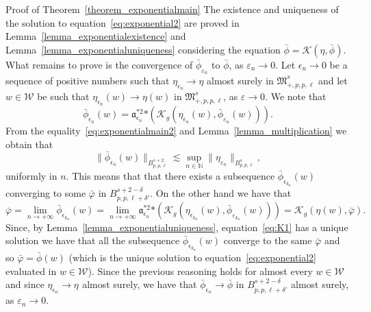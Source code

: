 \documentclass[a4paper,10pt]{article}
\newcommand{\asterisk}{\mathord{*}}
\newenvironment{proof*}[1]{\noindent\textbf{#1\ }}{\hspace*{\fill}$\Box$\medskip}
\begin{document}
\begin{proof*}{Proof of Theorem~\ref{theorem_exponentialmain}}
  The existence and uniqueness of the solution to
  equation~{\eqref{eq:exponential2}} are proved in
  Lemma~\ref{lemma_exponentialexistence} and
  Lemma~\ref{lemma_exponentialuniqueness} considering the equation $\bar{\phi}
  = \mathcal{K} (\eta, \bar{\phi})$. What remains to prove is the convergence
  of $\bar{\phi}_{\varepsilon_n}$ to $\bar{\phi}$, as $\varepsilon_n
  \rightarrow 0$. Let $\epsilon_n \rightarrow 0$ be a sequence of positive
  numbers such that $\eta_{\epsilon_n} \rightarrow \eta$ almost surely in
  $\mathfrak{M}^s_{+, p, p, \ell}$ and let $w \in \mathcal{W}$ be such that
  $\eta_{\epsilon_n} (w) \rightarrow \eta (w)$ in $\mathfrak{M}^s_{+, p, p,
  \ell}$, as $\varepsilon \rightarrow 0$. We note that
  \begin{equation}
    \bar{\phi}_{\epsilon_n} (w) = \mathfrak{a}^{\asterisk 2}_{\epsilon_n}
    \asterisk (\mathcal{K}_g (\eta_{\epsilon_n} (w),
    \bar{\phi}_{\varepsilon_n} (w))) . \label{eq:exponentialmain2}
  \end{equation}
  From the equality~{\eqref{eq:exponentialmain2}} and
  Lemma~\ref{lemma_multiplication} we obtain that
  \[ \| \bar{\phi}_{\epsilon_n} (w) \|_{B^{s + 2}_{p, p, \ell}} \lesssim
     \sup_{n \in \mathbb{N}} \| \eta_{\varepsilon_n} \|_{B^s_{p, p, \ell}}, \]
  uniformly in $n$. This means that that there exists a subsequence
  $\bar{\phi}_{\epsilon_{k_n}} (w)$ converging to some $\bar{\varphi}$ in
  $B^{s + 2 - \delta}_{p, p, \ell + \delta'}$. On the other hand we have that
  \[ \bar{\varphi} = \lim_{n \rightarrow + \infty}
     \bar{\phi}_{\epsilon_{k_n}} (w) = \lim_{n \rightarrow + \infty}
     \mathfrak{a}^{\asterisk 2}_{\epsilon_n} \asterisk \left( \mathcal{K}_g
     \left( \eta_{\epsilon_{k_n}} (w), \bar{\phi}_{\varepsilon_{k_n}} (w)
     \right) \right) = \mathcal{K}_g (\eta (w), \bar{\varphi}) . \]
  Since, by Lemma~\ref{lemma_exponentialuniqueness}, equation~{\eqref{eq:K1}}
  has a unique solution we have that all the subsequence
  $\bar{\phi}_{\epsilon_{k_n}} (w)$ converge to the same $\bar{\varphi}$ and
  so $\bar{\varphi} = \bar{\phi} (w)$ (which is the unique solution to
  equation~{\eqref{eq:exponential2}} evaluated in $w \in \mathcal{W}$). Since
  the previous reasoning holds for almost every $w \in \mathcal{W}$ and since
  $\eta_{\epsilon_n} \rightarrow \eta_{}$ almost surely, we have that
  $\bar{\phi}_{\epsilon_n} \rightarrow \bar{\phi}$ in $B^{s + 2 - \delta}_{p,
  p, \ell + \delta'}$ almost surely, as $\varepsilon_n \rightarrow 0$.
\end{proof*}
\end{document}
